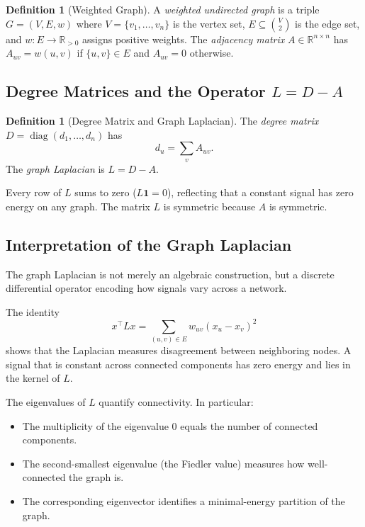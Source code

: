 \documentclass[11pt]{article}
\theoremstyle{definition}
\newtheorem{definition}[theorem]{Definition}
\theoremstyle{remark}
\newcommand{\R}{\mathbb{R}}
\DeclareMathOperator{\diag}{diag}
\begin{document}
\begin{definition}[Weighted Graph]
A \emph{weighted undirected graph} is a triple $G = (V, E, w)$ where
$V = \{v_1,\dots,v_n\}$ is the vertex set, $E \subseteq \binom{V}{2}$ is the
edge set, and $w\colon E \to \R_{>0}$ assigns positive weights. The
\emph{adjacency matrix} $A \in \R^{n\times n}$ has $A_{uv} = w(u,v)$ if
$\{u,v\}\in E$ and $A_{uv}=0$ otherwise.
\end{definition}

\subsection{Degree Matrices and the Operator $L = D-A$}

\begin{definition}[Degree Matrix and Graph Laplacian]
The \emph{degree matrix} $D = \diag(d_1,\dots,d_n)$ has
\[
  d_u = \sum_v A_{uv}.
\]
The \emph{graph Laplacian} is $L = D - A$.
\end{definition}

Every row of $L$ sums to zero ($L\mathbf{1}=0$), reflecting that a constant
signal has zero energy on any graph. The matrix $L$ is symmetric because $A$ is
symmetric.

\subsection{Interpretation of the Graph Laplacian}

The graph Laplacian is not merely an algebraic construction, but a discrete differential operator encoding how signals vary across a network.

The identity
\[
x^\top L x = \sum_{(u,v) \in E} w_{uv}(x_u - x_v)^2
\]
shows that the Laplacian measures disagreement between neighboring nodes. A signal that is constant across connected components has zero energy and lies in the kernel of $L$.

The eigenvalues of $L$ quantify connectivity. In particular:
\begin{itemize}
    \item The multiplicity of the eigenvalue $0$ equals the number of connected components.
    \item The second-smallest eigenvalue (the Fiedler value) measures how well-connected the graph is.
    \item The corresponding eigenvector identifies a minimal-energy partition of the graph.
\end{itemize}
\end{document}

